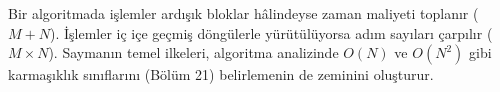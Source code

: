 Bir algoritmada işlemler ardışık bloklar hâlindeyse zaman maliyeti toplanır ($M + N$). İşlemler iç içe geçmiş döngülerle yürütülüyorsa adım sayıları çarpılır ($M \times N$). Saymanın temel ilkeleri, algoritma analizinde $O(N)$ ve $O(N^2)$ gibi karmaşıklık sınıflarını (Bölüm 21) belirlemenin de zeminini oluşturur.
